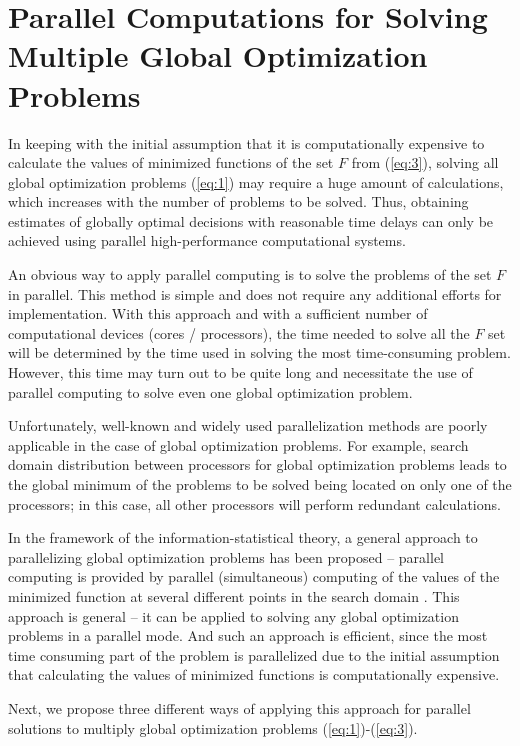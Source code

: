 \documentclass[review]{elsarticle}
\begin{document}
\section{Parallel Computations for Solving Multiple Global Optimization Problems}\label{sec:4}

In keeping with the initial assumption that it is computationally expensive to calculate the values of minimized functions of the set $F$ from (\ref{eq:3}), solving all global optimization problems (\ref{eq:1}) may require a huge amount of calculations, which increases with the number of problems to be solved. Thus, obtaining estimates of globally optimal decisions with reasonable time delays can only be achieved using parallel high-performance computational systems. 

An obvious way to apply parallel computing is to solve the problems of the set $F$ in parallel. This method is simple and does not require any additional efforts for implementation. With this approach and with a sufficient number of computational devices (cores / processors), the time needed to solve all the $F$ set will be determined by the time used in solving the most time-consuming problem. However, this time may turn out to be quite long and necessitate the use of parallel computing to solve even one global optimization problem.

Unfortunately, well-known and widely used parallelization methods are poorly applicable in the case of global optimization problems. For example, search domain distribution between processors for global optimization problems leads to the global minimum of the problems to be solved being located on only one of the processors; in this case, all other processors will perform redundant calculations.

In the framework of the information-statistical theory, a general approach to parallelizing global optimization problems has been proposed -- parallel computing is provided by parallel (simultaneous) computing of the values of the minimized function at several different points in the search domain \cite{c5}. This approach is general -- it can be applied to solving any global optimization problems in a parallel mode. And such an approach is efficient, since the most time consuming part of the problem is parallelized due to the initial assumption that calculating the values of minimized functions is computationally expensive.

Next, we propose three different ways of applying this approach for parallel solutions to multiply global optimization problems (\ref{eq:1})-(\ref{eq:3}).
\end{document}
